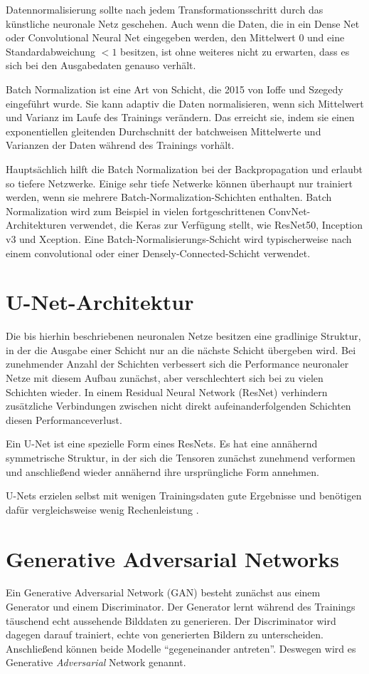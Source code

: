 Datennormalisierung sollte nach jedem Transformationsschritt durch das künstliche neuronale Netz geschehen. Auch wenn die Daten, die in ein Dense Net oder Convolutional Neural Net eingegeben werden, den Mittelwert $0$ und eine Standardabweichung $< 1$ besitzen, ist ohne weiteres nicht zu erwarten, dass es sich bei den Ausgabedaten genauso verhält.

Batch Normalization ist eine Art von Schicht, die 2015 von Ioffe und Szegedy \cite{ioffe2015batchnorm} eingeführt wurde. Sie kann adaptiv die Daten normalisieren, wenn sich Mittelwert und Varianz im Laufe des Trainings verändern. Das erreicht sie, indem sie einen exponentiellen gleitenden Durchschnitt der batchweisen Mittelwerte und Varianzen der Daten während des Trainings vorhält.

Hauptsächlich hilft die Batch Normalization bei der Backpropagation und erlaubt so tiefere Netzwerke. Einige sehr tiefe Netwerke können überhaupt nur trainiert werden, wenn sie mehrere Batch-Normalization-Schichten enthalten. Batch Normalization wird zum Beispiel in vielen fortgeschrittenen ConvNet-Architekturen verwendet, die Keras zur Verfügung stellt, wie ResNet50, Inception v3 und Xception. Eine Batch-Normalisierungs-Schicht wird typischerweise nach einem convolutional oder einer Densely-Connected-Schicht verwendet.
\cite{chollet2021deep}

\section{U-Net-Architektur}
\label{sec:unet}
Die bis hierhin beschriebenen neuronalen Netze besitzen eine gradlinige Struktur, in der die Ausgabe einer Schicht nur an die nächste Schicht übergeben wird. Bei zunehmender Anzahl der Schichten verbessert sich die Performance neuronaler Netze mit diesem Aufbau zunächst, aber verschlechtert sich bei zu vielen Schichten wieder. In einem Residual Neural Network (ResNet) verhindern zusätzliche Verbindungen zwischen nicht direkt aufeinanderfolgenden Schichten diesen Performanceverlust.

Ein U-Net ist eine spezielle Form eines ResNets. Es hat eine annähernd symmetrische Struktur, in der sich die Tensoren zunächst zunehmend verformen und anschließend wieder annähernd ihre ursprüngliche Form annehmen.

U-Nets erzielen selbst mit wenigen Trainingsdaten gute Ergebnisse und benötigen dafür vergleichsweise wenig Rechenleistung \cite{he2015deep}.

\section{Generative Adversarial Networks}
\label{gan}
Ein Generative Adversarial Network (GAN) besteht zunächst aus einem Generator und einem Discriminator. Der Generator lernt während des Trainings täuschend echt aussehende Bilddaten zu generieren. Der Discriminator wird dagegen darauf trainiert, echte von generierten Bildern zu unterscheiden. Anschließend können beide Modelle ``gegeneinander antreten''. Deswegen wird es Generative \textit{Adversarial} Network genannt.

